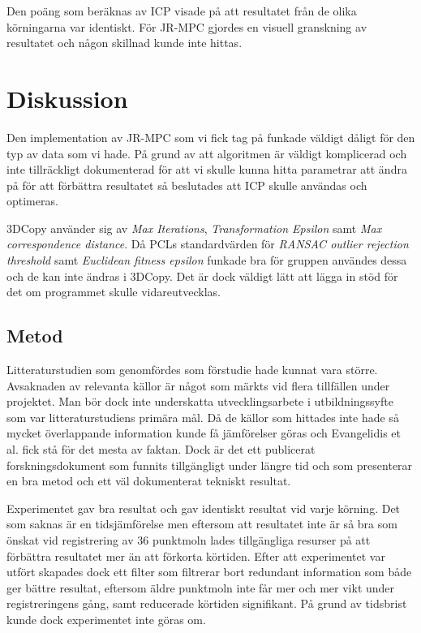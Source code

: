 Den poäng som beräknas av ICP visade på att resultatet från de olika körningarna var identiskt. För JR-MPC gjordes en visuell granskning av resultatet och någon skillnad kunde inte hittas.


\section{Diskussion}
\label{sec:discussion-karlsson}

Den implementation av JR-MPC som vi fick tag på funkade väldigt dåligt för den typ av data som vi hade. På grund av att algoritmen är väldigt komplicerad och inte tillräckligt dokumenterad för att vi skulle kunna hitta parametrar att ändra på för att förbättra resultatet så beslutades att ICP skulle användas och optimeras.

3DCopy använder sig av \textit{Max Iterations}, \textit{Transformation Epsilon} samt \textit{Max correspondence distance}. Då PCLs standardvärden för \textit{RANSAC outlier rejection threshold} samt \textit{Euclidean fitness epsilon} funkade bra för gruppen användes dessa och de kan inte ändras i 3DCopy. Det är dock väldigt lätt att lägga in stöd för det om programmet skulle vidareutvecklas.

\subsection{Metod}

Litteraturstudien som genomfördes som förstudie hade kunnat vara större. Avsaknaden av relevanta källor är något som märkts vid flera tillfällen under projektet. Man bör dock inte underskatta utvecklingsarbete i utbildningssyfte som var litteraturstudiens primära mål. Då de källor som hittades inte hade så mycket överlappande information kunde få jämförelser göras och Evangelidis et al. \cite{Evangelidis-ECCV-2014} fick stå för det mesta av faktan. Dock är det ett publicerat forskningsdokument som funnits tillgängligt under längre tid och som presenterar en bra metod och ett väl dokumenterat tekniskt resultat.

Experimentet gav bra resultat och gav identiskt resultat vid varje körning. Det som saknas är en tidsjämförelse men eftersom att resultatet inte är så bra som önskat vid registrering av 36 punktmoln lades tillgängliga resurser på att förbättra resultatet mer än att förkorta körtiden. Efter att experimentet var utfört skapades dock ett filter som filtrerar bort redundant information som både ger bättre resultat, eftersom äldre punktmoln inte får mer och mer vikt under registreringens gång, samt reducerade körtiden signifikant. På grund av tidsbrist kunde dock experimentet inte göras om. 

